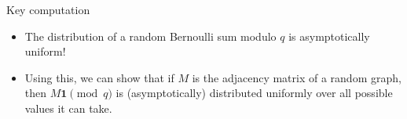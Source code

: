 \documentclass{beamer}
\theoremstyle{plain}
\newcommand{\Bern}{\text{Bern}}
\newcommand{\Z}{\mathbb{Z}}
\begin{document}
	\begin{frame}{Key computation}
		\begin{itemize}
			\item The distribution of a random Bernoulli sum modulo $q$ is asymptotically uniform!

			\pause

			\item Using this, we can show that if $M$ is the adjacency matrix of a random graph, then $M\boldsymbol{1} \pmod q$ is (asymptotically) distributed uniformly over all possible values it can take.


		\end{itemize}
	\end{frame}






\end{document}
